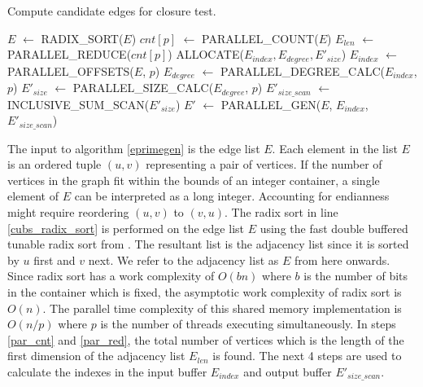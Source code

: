 \documentclass[conference]{IEEEtran}
\begin{document}
\begin{algorithm}
  \caption{Compute candidate edges for closure test.\label{eprimegen}}  
  \begin{algorithmic}[1]
    \Statex
      \State $E$ $\gets$ RADIX\_SORT($E$)  \label{cubs_radix_sort}
      \State $cnt[p]$ $\gets$ PARALLEL\_COUNT($E$)  \label{par_cnt}
      \State $E_{len}$ $\gets$ PARALLEL\_REDUCE($cnt[p]$) \label{par_red}
      \State ALLOCATE($E_{index}, E_{degree}, E'_{size}$) 
      \State $E_{index}$ $\gets$ PARALLEL\_OFFSETS($E$, $p$) \label{par_offset}
      \State $E_{degree}$ $\gets$ PARALLEL\_DEGREE\_CALC($E_{index}$, $p$) \label{par_deg_calc}
      \State $E'_{size}$ $\gets$ PARALLEL\_SIZE\_CALC($E_{degree}$, $p$) \label{par_size_calc}
      \State $E'_{size\_scan}$ $\gets$ INCLUSIVE\_SUM\_SCAN($E'_{size}$)
      \State $E'$ $\gets$ PARALLEL\_GEN($E$, $E_{index}$, $E'_{size\_scan}$) \label{par_gen}
      \State {}
    \EndFunction
  \end{algorithmic}
\end{algorithm}

The input to algorithm \ref{eprimegen} is the edge list $E$. Each element in the list $E$ is an ordered tuple $(u,v)$ representing a pair of vertices. If the number of vertices in the graph fit within the bounds of an integer container, a single element of $E$ can be interpreted as a long integer. Accounting for endianness might require reordering $(u,v)$ to $(v,u)$. The radix sort in line \ref{cubs_radix_sort} is performed on the edge list $E$ using the fast double buffered tunable radix sort from \cite{b19}. The resultant list is the adjacency list since it is sorted by $u$ first and $v$ next. We refer to the adjacency list as $E$ from here onwards. Since radix sort has a work complexity of $O(bn)$ where $b$ is the number of bits in the container which is fixed, the asymptotic work complexity of radix sort is $O(n)$. The parallel time complexity of this shared memory implementation is $O(n/p)$ where $p$ is the number of threads executing simultaneously. In steps \ref{par_cnt} and \ref{par_red}, the total number of vertices which is the length of the first dimension of the adjacency list $E_{len}$ is found. The next 4 steps are used to calculate the indexes in the input buffer $E_{index}$ and output buffer $E'_{size\_scan}$. 
\end{document}

